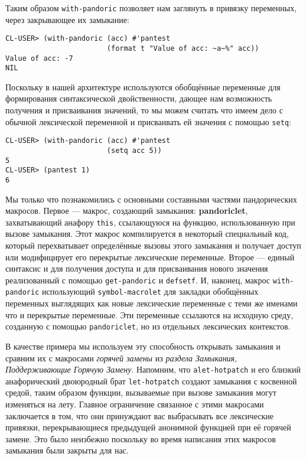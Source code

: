 Таким образом \verb"with-pandoric" позволяет нам заглянуть в привязку переменных, через закрывающее их замыкание:

\begin{verbatim}
CL-USER> (with-pandoric (acc) #'pantest
                        (format t "Value of acc: ~a~%" acc))
Value of acc: -7
NIL
\end{verbatim}

Поскольку в нашей архитектуре используются обобщённые переменные для формирования синтаксической двойственности, дающее нам возможность получения и присваивания значений, то мы можем считать что имеем дело с обычной лексической переменной и присваивать ей значения с помощью \verb"setq":

\begin{verbatim}
CL-USER> (with-pandoric (acc) #'pantest
                        (setq acc 5))
5
CL-USER> (pantest 1)
6
\end{verbatim}

Мы только что познакомились с основными составными частями пандорических макросов. Первое --- макрос, создающий замыкания: \foreignlanguage{english}{\textbf{pandoriclet}}, захватывающий анафору \verb"this", ссылающуюся на функцию, использованную при вызове замыкания. Этот макрос компилируется в некоторый специальный код, который перехватывает определённые вызовы этого замыкания и получает доступ или модифицирует его перекрытые лексические переменные. Второе --- единый синтаксис и для получения доступа и для присваивания нового значения реализованный с помощью \verb"get-pandoric" и \verb"defsetf". И, наконец, макрос \verb"with-pandoric" использующий \verb"symbol-macrolet" для закладки обобщённых переменных выглядящих как новые лексические переменные с теми же именами что и перекрытые переменные. Эти переменные ссылаются на исходную среду, созданную с помощью \verb"pandoriclet", но из отдельных лексических контекстов.

В качестве примера мы используем эту способность открывать замыкания и сравним их с макросами \emph{горячей замены} из \emph{раздела Замыкания, Поддерживающие Горячую Замену}. Напомним, что \verb"alet-hotpatch" и его близкий анафорический двоюродный брат \verb"let-hotpatch" создают замыкания с косвенной средой, таким образом функции, вызываемые при вызове замыкания могут изменяться на лету. Главное ограничение связанное с этими макросами заключается в том, что они принуждают вас выбрасывать все лексические привязки, перекрывающиеся предыдущей анонимной функцией при её горячей замене. Это было неизбежно поскольку во время написания этих макросов замыкания были закрыты для нас.

